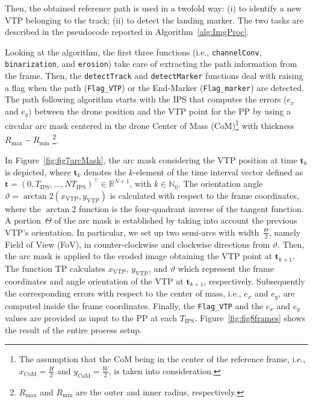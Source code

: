 \documentclass[a4paper,twocolumn,10pt]{article}
\begin{document}
    Then, the obtained reference path is used in a twofold way: (i) to identify a new VTP belonging to the track; (ii) to detect the landing marker. The two tasks are described in the 
    pseudocode reported in Algorithm~\ref{alg:ImgProc}.

    Looking at the algorithm, the first three functions (i.e., \texttt{channelConv}, \texttt{binarization}, and \texttt{erosion}) take care of extracting the path information from the frame. Then, the \texttt{detectTrack} and \texttt{detectMarker} functions deal with raising a flag when the path (\texttt{Flag\_VTP}) or the End-Marker (\texttt{Flag\_marker}) are detected. The path following algorithm starts with the IPS that computes the errors ($e_x$ and $e_y$) between the drone position and the VTP point for the PP by using a circular arc mask centered in the 
    drone Center of Mass (CoM)\footnote{The assumption that the CoM being in the center of the reference 
    frame, i.e., $x_\mathrm{CoM} = \frac{H}{2}$ and $y_\mathrm{CoM}=\frac{W}{2}$, is taken into consideration.} with thickness $R_\mathrm{max} - R_\mathrm{min}$
    \footnote{$R_\mathrm{max}$ and $R_\mathrm{min}$ are the outer and inner radius, respectively.}. 

    In Figure~\ref{fig:fig7arcMask}, the arc mask considering the VTP position at time $\mathbf{t}_k$ 
    is depicted, where $\mathbf{t}_k$ denotes the $k$-element of the time interval vector defined as 
    $\mathbf{t} =(0, T_\mathrm{IPS}, \dots, NT_\mathrm{IPS})^\top \in \mathbb{R}^{N+1}$, with $k \in 
    \mathbb{N}_0$. The orientation angle \mbox{$\vartheta = \arctan$2$(x_\mathrm{VTP},y_\mathrm{VTP})$} 
    is calculated with respect to the frame coordinates, where the $\arctan$2 function is the 
    four-quadrant inverse of the tangent function. A portion~$\varTheta$ of the arc mask is established 
    by taking into account the previous VTP's orientation. In particular, we set up two semi-arcs 
    with width~$\frac{\varTheta}{2}$, namely Field of View (FoV), in counter-clockwise and clockwise 
    directions from $\vartheta$. Then, the arc mask is applied to the eroded image obtaining 
    the VTP point at $\mathbf{t}_{k+1}$. The function TP calculates $x_\mathrm{VTP}$, 
    $y_\mathrm{VTP}$, and $\vartheta$ which represent the frame coordinates and angle orientation of 
    the VTP at  $\mathbf{t}_{k+1}$, respectively. Subsequently the corresponding errors with 
    respect to the center of mass, i.e., $e_x$ and $e_y$, are computed inside the frame coordinates. 
    Finally, the \texttt{Flag\_VTP} and the $e_x$ and $e_y$ values are provided as input to the PP 
    at each $T_\mathrm{IPS}$. Figure~\ref{fig:fig8frames} shows the result of the entire process setup. 
\end{document}
